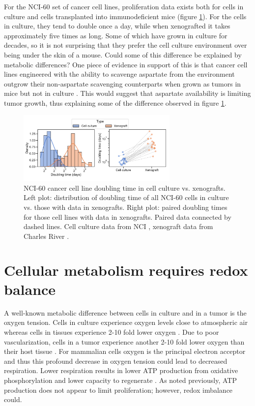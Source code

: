 For the NCI-60 set of cancer cell lines, proliferation data exists both for cells in culture and cells transplanted into immunodeficient mice (figure \ref{fig:ch1:prlfr_contr}).
For the cells in culture, they tend to double once a day, while when xenografted it takes approximately five times as long.
Some of which have grown in culture for decades, so it is not surprising that they prefer the cell culture environment over being under the skin of a mouse.
Could some of this difference be explained by metabolic differences?
One piece of evidence in support of this is that cancer cell lines engineered with the ability to scavenge aspartate from the environment outgrow their non-aspartate scavenging counterparts when grown as tumors in mice but not in culture \cite{Sullivan2018-gz, Garcia-Bermudez2018-mj}.
This would suggest that aspartate availability is limiting tumor growth, thus explaining some of the difference observed in figure \ref{fig:ch1:prlfr_contr}.

\begin{figure}
    \centering
    \includegraphics[width=0.70\textwidth]{figures/chap1/prlfr_contr.pdf}
    \caption[NCI-60 cancer cell line doubling time in cell culture vs. xenografts.]{
    NCI-60 cancer cell line doubling time in cell culture vs. xenografts.
    Left plot: distribution of doubling time of all NCI-60 cells in culture vs. those with data in xenografts.
    Right plot: paired doubling times for those cell lines with data in xenografts.
    Paired data connected by dashed lines.
    Cell culture data from NCI \cite{NCI60}, xenograft data from Charles River \cite{CR_tumor}.
    }
    \label{fig:ch1:prlfr_contr}
\end{figure}




\section{Cellular metabolism requires redox balance}
A well-known metabolic difference between cells in culture and in a tumor is the oxygen tension.
Cells in culture experience oxygen levels close to atmospheric air whereas cells in tissues experience 2-10 fold lower oxygen \cite{Ast2019-hh}.
Due to poor vascularization, cells in a tumor experience another 2-10 fold lower oxygen than their host tissue \cite{McKeown2014-tt}.
For mammalian cells oxygen is the principal electron acceptor and thus this profound decrease in oxygen tension could lead to decreased respiration.
Lower respiration results in lower ATP production from oxidative phosphorylation and lower capacity to regenerate \NAD.
As noted previously, ATP production does not appear to limit proliferation; however, redox imbalance could. 


